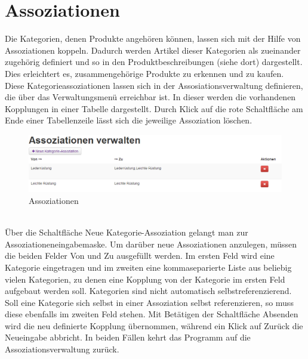 \section{Assoziationen}
Die Kategorien, denen Produkte angehören können, lassen sich mit der Hilfe von Assoziationen koppeln. Dadurch werden Artikel dieser Kategorien als zueinander zu\-ge\-hö\-rig definiert und so in den Produktbeschreibungen (siehe dort) dargestellt. Dies erleichtert es, zusammengehörige Produkte zu erkennen und zu kaufen. Diese Kategorieassoziationen lassen sich in der Assosiationsverwaltung definieren, die über das Verwaltungsmenü erreichbar ist. In dieser werden die vorhandenen Kopplungen in einer Tabelle dargestellt. Durch Klick auf die rote Schaltfläche am Ende einer Tabellenzeile lässt sich die jeweilige Assoziation löschen. \\

\begin{figure}[h!]
  \centering
  \includegraphics[width=\textwidth]{img/Assoziationen.png}
  \caption{Assoziationen}
  \label{fig:Assoziationen}
\end{figure}
\text{}\vspace*{-1em}\\
Über die Schaltfläche Neue Kategorie-Assoziation gelangt man zur Asso\-zia\-tionen\-ein\-ga\-be\-mas\-ke. Um darüber neue Assoziationen anzulegen, müssen die beiden Felder Von und Zu ausgefüllt werden.  Im ersten Feld wird eine Kategorie eingetragen und im zweiten eine kommaseparierte Liste aus beliebig vielen Kategorien, zu denen eine Kopplung von der Kategorie im ersten Feld aufgebaut werden soll. Kategorien sind nicht automatisch selbstreferenzierend. Soll eine Kategorie sich selbst in einer Assoziation selbst referenzieren, so muss diese ebenfalls im zweiten Feld stehen. Mit Betätigen der Schaltfläche Absenden wird die neu definierte Kopplung übernommen, während ein Klick auf Zurück die Neueingabe abbricht. In beiden Fällen kehrt das Programm auf die Assoziationsverwaltung zurück.



